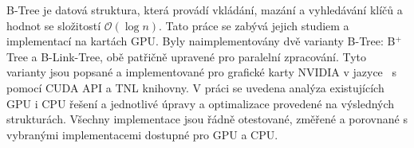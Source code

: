 B-Tree je datová struktura, která provádí vkládání, mazání a vyhledávání klíčů a hodnot se složitostí $\mathcal{O}(\log{n})$. Tato práce se zabývá jejich studiem a implementací na kartách GPU. Byly naimplementovány dvě varianty B-Tree: B$^+$Tree a B-Link-Tree, obě patřičně upravené pro paralelní zpracování. Tyto varianty jsou popsané a implementované pro grafické karty NVIDIA v jazyce \CC\ s pomocí CUDA API a TNL knihovny. V práci se uvedena analýza existujících GPU i CPU řešení a jednotlivé úpravy a optimalizace provedené na výsledných strukturách. Všechny implementace jsou řádně otestované, změřené a porovnané s vybranými implementacemi dostupné pro GPU a CPU.